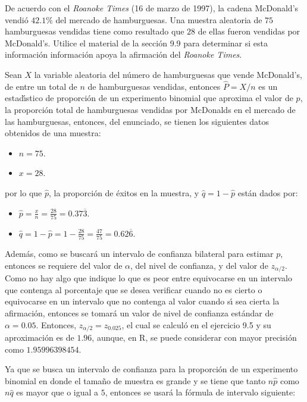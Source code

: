 \begin{enunciado}
 De acuerdo con el \textit{Roanoke Times} (16 de marzo de 1997), la cadena McDonald's vendi\'o $42.1\%$ del mercado de hamburguesas. Una muestra aleatoria de $75$ hamburguesas vendidas tiene como resultado que $28$ de ellas fueron vendidas por McDonald's. Utilice el material de la secci\'on 9.9 para determinar si esta informaci\'on informaci\'on apoya la afirmaci\'on del \textit{Roanoke Times}.
\end{enunciado}

\begin{solucion}
 Sean $X$ la variable aleatoria del n\'umero de hamburguesas que vende McDonald's, de entre un  total de $n$ de hamburguesas vendidas, entonces $\widehat{P} = X/n$ es un estad\'{\i}stico de proporci\'on de un experimento binomial que aproxima el valor de $p$, la proporci\'on total de hamburguesas vendidas por McDonalds en el mercado de las hamburguesas, entonces, del enunciado, se tienen los siguientes datos obtenidos de una muestra:
 \begin{itemize}
  \item $n = 75$.
  \item $x = 28$.
 \end{itemize}
 por lo que $\hat{p}$, la proporci\'on de \'exitos en la muestra, y $\hat{q} = 1 - \hat{p}$ est\'an dados por:
 \begin{itemize}
  \item $\hat{p} = \frac{x}{n} = \frac{28}{75} = 0.37\overline{3}$.
  \item $\hat{q} = 1 - \hat{p} = 1 - \frac{28}{75} = \frac{47}{75} = 0.62\overline{6}$.
 \end{itemize}
 Adem\'as, como se buscar\'a un intervalo de confianza bilateral para estimar $p$, entonces se requiere del valor de $\alpha$, del nivel de confianza, y del valor de $z_{\alpha/ 2}$. Como no hay algo que indique lo que es peor entre equivocarse en un intervalo que contenga al porcentaje que se desea verificar cuando no es cierto o equivocarse en un intervalo que no contenga al valor cuando s\'{\i} sea cierta la afirmaci\'on, entonces se tomar\'a un valor de nivel de confianza est\'andar de $\alpha = 0.05$. Entonces, $z_{\alpha/2} = z_{0.025}$, el cual se calcul\'o en el ejercicio 9.5 y su aproximaci\'on es de $1.96$, aunque, en R, se puede considerar con mayor precisi\'on como $1.95996398454$.
 \par
 Ya que se busca un intervalo de confianza para la proporci\'on de un experimento binomial en donde el tama\~no de muestra es grande y se tiene que tanto $n\hat{p}$ como $n\hat{q}$ es mayor que o igual a $5$, entonces se usar\'a la f\'ormula de intervalo siguiente:

\end{solucion}
